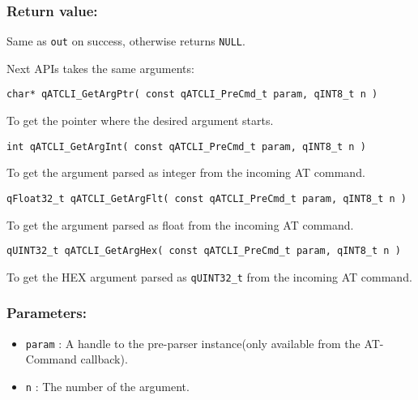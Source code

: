 \subsubsection*{Return value:}
Same as \lstinline{out} on success, otherwise returns \lstinline{NULL}.

\noindent\hrulefill
\newline
Next APIs takes the same arguments: \\

\begin{lstlisting}[style=CStyle]
char* qATCLI_GetArgPtr( const qATCLI_PreCmd_t param, qINT8_t n )
\end{lstlisting}

To get the pointer where the desired argument starts. 

\begin{lstlisting}[style=CStyle]
int qATCLI_GetArgInt( const qATCLI_PreCmd_t param, qINT8_t n )
\end{lstlisting}

To get the argument parsed as integer from the incoming AT command. 

\begin{lstlisting}[style=CStyle]
qFloat32_t qATCLI_GetArgFlt( const qATCLI_PreCmd_t param, qINT8_t n )
\end{lstlisting}

To get the argument parsed as float from the incoming AT command. 

\begin{lstlisting}[style=CStyle]
qUINT32_t qATCLI_GetArgHex( const qATCLI_PreCmd_t param, qINT8_t n )
\end{lstlisting}

To get the HEX argument parsed as \lstinline{qUINT32_t} from the incoming AT command. 


\subsubsection*{Parameters:}
\begin{itemize}
    \item \lstinline{param} : A handle to the pre-parser instance(only available from the AT-Command callback).
    \item \lstinline{n} : The number of the argument.
\end{itemize}

